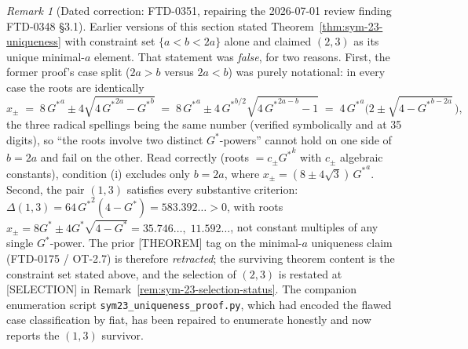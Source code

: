 \documentclass[11pt]{article}
\theoremstyle{definition}
\theoremstyle{remark}
\newtheorem*{remark}{Remark}
\newcommand{\Gs}{G^{*}}
\begin{document}
\begin{remark}[Dated correction: FTD-0351, repairing the 2026-07-01 review finding FTD-0348 \S3.1]
\label{rem:sym-23-correction}
Earlier versions of this section stated
Theorem~\ref{thm:sym-23-uniqueness} with constraint set
$\{a < b < 2a\}$ alone and claimed $(2, 3)$ as its unique minimal-$a$
element. That statement was \emph{false}, for two reasons.
First, the former proof's case split ($2a > b$ versus $2a < b$) was
purely notational: in every case the roots are identically
\[
x_\pm \;=\; 8\,{\Gs}^{a} \pm 4\sqrt{4\,{\Gs}^{2a} - {\Gs}^{b}}
      \;=\; 8\,{\Gs}^{a} \pm 4\,{\Gs}^{b/2}\sqrt{4\,{\Gs}^{2a-b} - 1}
      \;=\; 4\,{\Gs}^{a}\bigl(2 \pm \sqrt{4 - {\Gs}^{b-2a}}\,\bigr),
\]
the three radical spellings being the same number (verified
symbolically and at 35 digits), so ``the roots involve two distinct
${\Gs}$-powers'' cannot hold on one side of $b = 2a$ and fail on the
other. Read correctly (roots $= c_\pm{\Gs}^{k}$ with $c_\pm$ algebraic
constants), condition \textup{(i)} excludes only $b = 2a$, where
$x_\pm = (8 \pm 4\sqrt3)\,{\Gs}^{a}$.
Second, the pair $(1, 3)$ satisfies every substantive criterion:
$\Delta(1, 3) = 64\,{\Gs}^{2}(4 - \Gs) = 583.392\ldots > 0$, with roots
$x_\pm = 8\Gs \pm 4\Gs\sqrt{4 - \Gs} = 35.746\ldots,\; 11.592\ldots$,
not constant multiples of any single ${\Gs}$-power.
The prior \textup{[THEOREM]} tag on the minimal-$a$ uniqueness claim
(FTD-0175 / OT-2.7) is therefore \emph{retracted}; the surviving
theorem content is the constraint set stated above, and the selection
of $(2, 3)$ is restated at \textup{[SELECTION]} in
Remark~\ref{rem:sym-23-selection-status}. The companion enumeration
script \texttt{sym23\_uniqueness\_proof.py}, which had encoded the
flawed case classification by fiat, has been repaired to enumerate
honestly and now reports the $(1, 3)$ survivor.
\end{remark}
\end{document}
